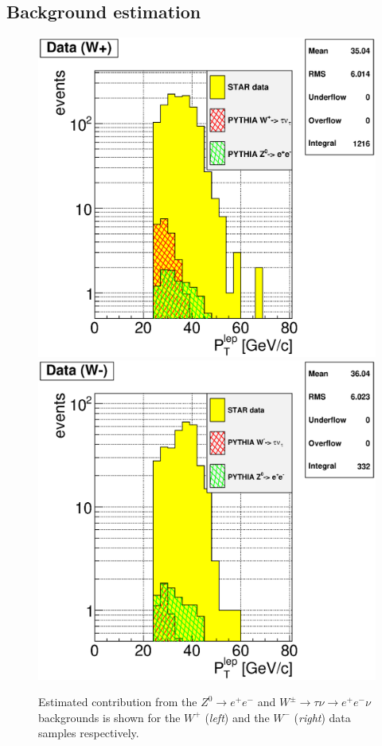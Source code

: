 \documentclass[12pt]{article}
\begin{document}
\subsection{Background estimation}


\begin{figure}[htbp]
\begin{center}
\includegraphics[scale=0.43]{images/backgrounds/plot_4}
\includegraphics[scale=0.43]{images/backgrounds/plot_6}
\end{center}
\caption{Estimated contribution from the $Z^{0} \rightarrow e^+e^-$ and $W^{\pm} \rightarrow \tau\nu \rightarrow e^+e^-\nu$ backgrounds is shown for the $W^{+}$ ({\it left}) and the $W^{-}$ ({\it right}) data samples respectively.}
\label{fig:plot_WZ_backgrounds} 
\end{figure}
\end{document}
